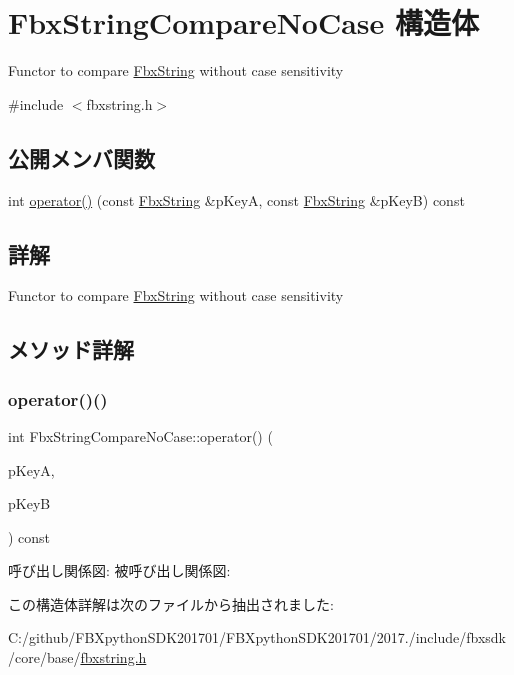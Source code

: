 \hypertarget{struct_fbx_string_compare_no_case}{}\section{Fbx\+String\+Compare\+No\+Case 構造体}
\label{struct_fbx_string_compare_no_case}


Functor to compare \hyperlink{class_fbx_string}{Fbx\+String} without case sensitivity  




{\ttfamily \#include $<$fbxstring.\+h$>$}

\subsection*{公開メンバ関数}
\begin{DoxyCompactItemize}
\item 
int \hyperlink{struct_fbx_string_compare_no_case_a36f7111fa137dead21e47a154133c188}{operator()} (const \hyperlink{class_fbx_string}{Fbx\+String} \&p\+KeyA, const \hyperlink{class_fbx_string}{Fbx\+String} \&p\+KeyB) const
\end{DoxyCompactItemize}


\subsection{詳解}
Functor to compare \hyperlink{class_fbx_string}{Fbx\+String} without case sensitivity 

\subsection{メソッド詳解}
\mbox{\label{struct_fbx_string_compare_no_case_a36f7111fa137dead21e47a154133c188}} 
\subsubsection{\texorpdfstring{operator()()}{operator()()}}
{\footnotesize\ttfamily int Fbx\+String\+Compare\+No\+Case\+::operator() (\begin{DoxyParamCaption}\item[{const \hyperlink{class_fbx_string}{Fbx\+String} \&}]{p\+KeyA,  }\item[{const \hyperlink{class_fbx_string}{Fbx\+String} \&}]{p\+KeyB }\end{DoxyParamCaption}) const}

呼び出し関係図\+:
被呼び出し関係図\+:


この構造体詳解は次のファイルから抽出されました\+:\begin{DoxyCompactItemize}
\item 
C\+:/github/\+F\+B\+Xpython\+S\+D\+K201701/\+F\+B\+Xpython\+S\+D\+K201701/2017./include/fbxsdk/core/base/\hyperlink{fbxstring_8h}{fbxstring.\+h}\end{DoxyCompactItemize}

